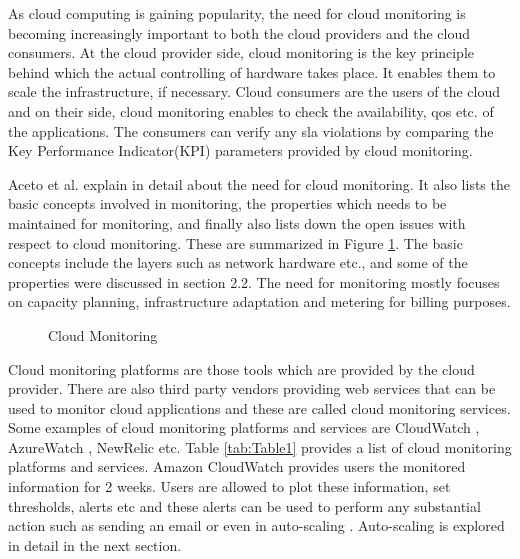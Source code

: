 \documentclass[article,type=msc,colorback,12pt,accentcolor=tud8b,table]{tudthesis}
\begin{document}
 	As cloud computing is gaining popularity, the need for cloud monitoring is becoming increasingly important to  both the cloud providers and the cloud consumers. At the cloud provider side, cloud monitoring is the key principle behind which the actual controlling of hardware takes place. It enables them to scale the infrastructure, if necessary. Cloud consumers are the users of the cloud and on their side, cloud monitoring enables to check the availability, \gls{qos} etc. of the applications. The consumers can verify any \gls{sla} violations by comparing the Key Performance Indicator(KPI) parameters provided by cloud monitoring.
 	
 	Aceto et al. \cite{aceto2013cloud} explain in detail about the need for cloud monitoring. It also lists the basic concepts involved in monitoring, the properties which needs to be maintained for monitoring, and finally also lists down the open issues with respect to cloud monitoring. These are summarized in Figure \ref{fig:cloud_monitor}. The basic concepts include the layers such as network hardware etc., and some of the properties were discussed in section 2.2. The need for monitoring mostly focuses on capacity planning, infrastructure adaptation and metering for billing purposes.
 	
 	\begin{figure}
 		\begin{center}
 			\makebox[\textwidth]{\texttt{[image: B5]}}
 		\end{center}
 		\caption{Cloud Monitoring \cite{aceto2013cloud}}
 		\label{fig:cloud_monitor}
 	\end{figure}
	
	Cloud monitoring platforms are those tools which are provided by the cloud provider. There are also third party vendors providing web services that can be used to monitor cloud applications and these are called cloud monitoring services. Some examples of cloud monitoring platforms and services are CloudWatch \cite{cloudwatchdev} \cite{cloudwatch}, AzureWatch \cite{azurewatch} , NewRelic \cite{newrelic} etc. Table \ref{tab:Table1} provides a list of cloud monitoring platforms and services. Amazon CloudWatch provides users the monitored information for 2 weeks. Users are allowed to plot these information, set thresholds, alerts etc and these alerts can be used to perform any substantial action such as sending an email or even in auto-scaling \cite{aas}. Auto-scaling is explored in detail in the next section. 
	
\end{document}
